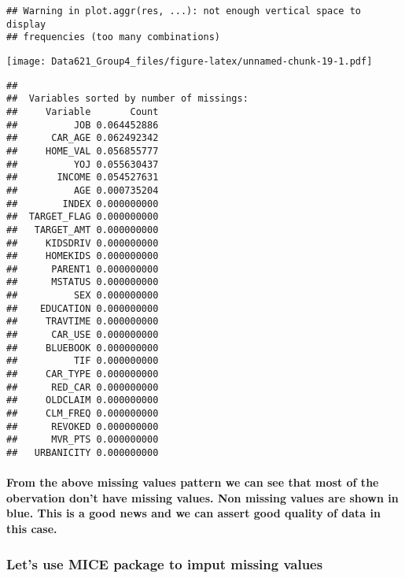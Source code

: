 \documentclass[]{article}
\let\oldparagraph\paragraph
\renewcommand{\paragraph}[1]{\oldparagraph{#1}\mbox{}}
\begin{document}
\begin{verbatim}
## Warning in plot.aggr(res, ...): not enough vertical space to display
## frequencies (too many combinations)
\end{verbatim}

\texttt{[image: Data621\_Group4\_files/figure-latex/unnamed-chunk-19-1.pdf]}

\begin{verbatim}
## 
##  Variables sorted by number of missings: 
##     Variable       Count
##          JOB 0.064452886
##      CAR_AGE 0.062492342
##     HOME_VAL 0.056855777
##          YOJ 0.055630437
##       INCOME 0.054527631
##          AGE 0.000735204
##        INDEX 0.000000000
##  TARGET_FLAG 0.000000000
##   TARGET_AMT 0.000000000
##     KIDSDRIV 0.000000000
##     HOMEKIDS 0.000000000
##      PARENT1 0.000000000
##      MSTATUS 0.000000000
##          SEX 0.000000000
##    EDUCATION 0.000000000
##     TRAVTIME 0.000000000
##      CAR_USE 0.000000000
##     BLUEBOOK 0.000000000
##          TIF 0.000000000
##     CAR_TYPE 0.000000000
##      RED_CAR 0.000000000
##     OLDCLAIM 0.000000000
##     CLM_FREQ 0.000000000
##      REVOKED 0.000000000
##      MVR_PTS 0.000000000
##   URBANICITY 0.000000000
\end{verbatim}

\hypertarget{from-the-above-missing-values-pattern-we-can-see-that-most-of-the-obervation-dont-have-missing-values.-non-missing-values-are-shown-in-blue.-this-is-a-good-news-and-we-can-assert-good-quality-of-data-in-this-case.}{%
\paragraph{From the above missing values pattern we can see that most of
the obervation don't have missing values. Non missing values are shown
in blue. This is a good news and we can assert good quality of data in
this
case.}\label{from-the-above-missing-values-pattern-we-can-see-that-most-of-the-obervation-dont-have-missing-values.-non-missing-values-are-shown-in-blue.-this-is-a-good-news-and-we-can-assert-good-quality-of-data-in-this-case.}}

\hypertarget{lets-use-mice-package-to-imput-missing-values}{%
\subsubsection{\texorpdfstring{\textbf{Let's use MICE package to imput
missing
values}}{Let's use MICE package to imput missing values}}\label{lets-use-mice-package-to-imput-missing-values}}
\end{document}

